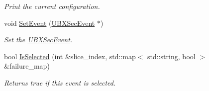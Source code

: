 \begin{DoxyCompactItemize}
\begin{DoxyCompactList}\small\item\em Print the current configuration. \end{DoxyCompactList}\item 
\hypertarget{classubana_1_1NuMuCCEventSelection_aab2612c63b22127e3d3909c8fdd8b9b7}{void \hyperlink{classubana_1_1NuMuCCEventSelection_aab2612c63b22127e3d3909c8fdd8b9b7}{Set\-Event} (\hyperlink{classUBXSecEvent}{U\-B\-X\-Sec\-Event} $\ast$)}\label{classubana_1_1NuMuCCEventSelection_aab2612c63b22127e3d3909c8fdd8b9b7}

\begin{DoxyCompactList}\small\item\em Set the \hyperlink{classUBXSecEvent}{U\-B\-X\-Sec\-Event}. \end{DoxyCompactList}\item 
\hypertarget{classubana_1_1NuMuCCEventSelection_a38fa46912387cdcb298ae59dcea7e7ca}{bool \hyperlink{classubana_1_1NuMuCCEventSelection_a38fa46912387cdcb298ae59dcea7e7ca}{Is\-Selected} (int \&slice\-\_\-index, std\-::map$<$ std\-::string, bool $>$ \&failure\-\_\-map)}\label{classubana_1_1NuMuCCEventSelection_a38fa46912387cdcb298ae59dcea7e7ca}

\begin{DoxyCompactList}\small\item\em Returns true if this event is selected. \end{DoxyCompactList}\end{DoxyCompactItemize}
